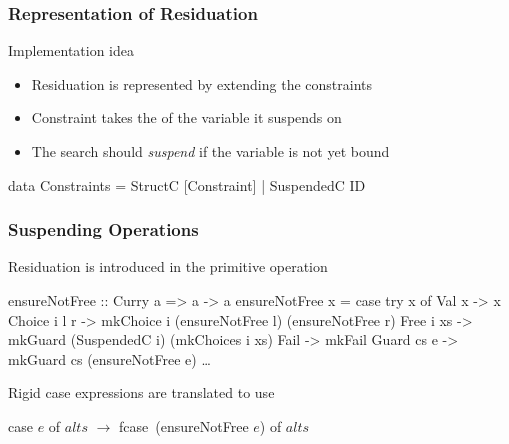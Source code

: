 \documentclass[
,xcolor=dvipsnames
]{beamer}
\newcommand{\blocktitle}[1]{%
{\medskip\usebeamerfont{subtitle}\usebeamercolor[fg]{subtitle}#1\smallskip}
}
\begin{document}
\begin{frame}[fragile]%
\frametitle{Representation of Residuation}

\blocktitle{Implementation idea}

\begin{itemize}
\item Residuation is represented by extending the constraints
\item Constraint takes the  of the variable it suspends on
\item The search should \emph{suspend} if the variable is not yet bound
\end{itemize}

\begin{haskell}
data Constraints = StructC [Constraint]
                 \alert{| SuspendedC ID}
\end{haskell}

\end{frame}

\begin{frame}[fragile]%
\frametitle{Suspending Operations}

Residuation is introduced in the primitive operation 

\begin{haskell}
ensureNotFree :: Curry a => a -> a
ensureNotFree x = case try x of
  Val x        -> x
  Choice i l r -> mkChoice i (ensureNotFree l) (ensureNotFree r)
  \alert{Free i xs    -> mkGuard (SuspendedC i) (mkChoices i xs)}
  Fail         -> mkFail
  Guard cs e   -> mkGuard cs (ensureNotFree e)
  \ldots
\end{haskell}

\pause

Rigid case expressions are translated to use 

\begin{example}
case $e$ of $alts$ $\to$ fcase\footnotemark~(ensureNotFree $e$) of $alts$
\end{example}
\end{frame}
\end{document}

